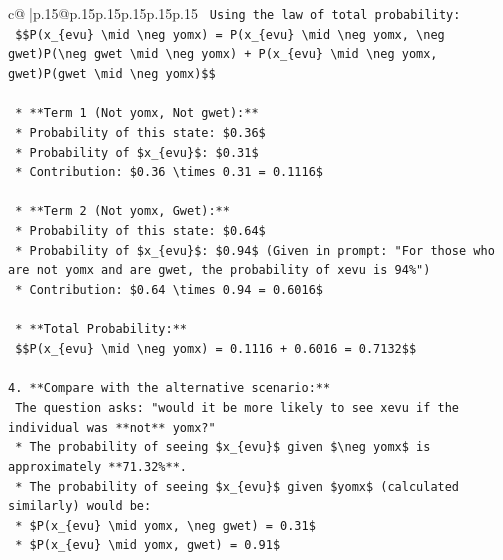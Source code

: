 \documentclass{article}
\begin{document}
{\begin{supertabular}{c@{$\;$}|p{.15\linewidth}@{}p{.15\linewidth}p{.15\linewidth}p{.15\linewidth}p{.15\linewidth}p{.15\linewidth}}
{{{\texttt{    Using the law of total probability:} \\
\texttt{    \$\$P(x\_\{evu\} \textbackslash{}mid \textbackslash{}neg yomx) = P(x\_\{evu\} \textbackslash{}mid \textbackslash{}neg yomx, \textbackslash{}neg gwet)P(\textbackslash{}neg gwet \textbackslash{}mid \textbackslash{}neg yomx) + P(x\_\{evu\} \textbackslash{}mid \textbackslash{}neg yomx, gwet)P(gwet \textbackslash{}mid \textbackslash{}neg yomx)\$\$} \\
\\ 
\texttt{    *   **Term 1 (Not yomx, Not gwet):**} \\
\texttt{        *   Probability of this state: \$0.36\$} \\
\texttt{        *   Probability of \$x\_\{evu\}\$: \$0.31\$} \\
\texttt{        *   Contribution: \$0.36 \textbackslash{}times 0.31 = 0.1116\$} \\
\\ 
\texttt{    *   **Term 2 (Not yomx, Gwet):**} \\
\texttt{        *   Probability of this state: \$0.64\$} \\
\texttt{        *   Probability of \$x\_\{evu\}\$: \$0.94\$ (Given in prompt: "For those who are not yomx and are gwet, the probability of xevu is 94\%")} \\
\texttt{        *   Contribution: \$0.64 \textbackslash{}times 0.94 = 0.6016\$} \\
\\ 
\texttt{    *   **Total Probability:**} \\
\texttt{        \$\$P(x\_\{evu\} \textbackslash{}mid \textbackslash{}neg yomx) = 0.1116 + 0.6016 = 0.7132\$\$} \\
\\ 
\texttt{4.  **Compare with the alternative scenario:**} \\
\texttt{    The question asks: "would it be more likely to see xevu if the individual was **not** yomx?"} \\
\texttt{    *   The probability of seeing \$x\_\{evu\}\$ given \$\textbackslash{}neg yomx\$ is approximately **71.32\%**.} \\
\texttt{    *   The probability of seeing \$x\_\{evu\}\$ given \$yomx\$ (calculated similarly) would be:} \\
\texttt{        *   \$P(x\_\{evu\} \textbackslash{}mid yomx, \textbackslash{}neg gwet) = 0.31\$} \\
\texttt{        *   \$P(x\_\{evu\} \textbackslash{}mid yomx, gwet) = 0.91\$} \\
}}}
\end{supertabular}}
\end{document}
